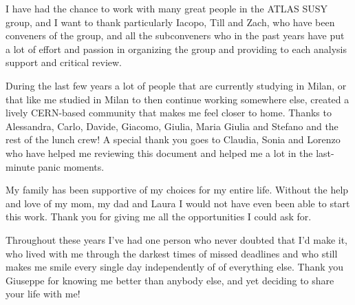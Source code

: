 \par\bigskip
I have had the chance to work with many great people in the ATLAS SUSY group, and 
I want to thank particularly Iacopo, Till and Zach, who have been conveners of the group,
and all the subconveners who in the past years 
have put a lot of effort and passion in organizing the group and providing to each 
analysis support and critical review. 

\par\bigskip 

During the last few years a lot of people that are currently studying in Milan, or that like me 
studied in Milan to then continue working somewhere else, created a lively CERN-based community that 
makes me feel closer to home. 
Thanks to Alessandra, Carlo, Davide, Giacomo, Giulia, Maria Giulia and Stefano and the rest of the 
lunch crew! A special thank you goes to Claudia, Sonia and Lorenzo who have helped me reviewing this document and 
helped me a lot in the last-minute panic moments. 

\par\bigskip 
My family has been supportive of my choices for my entire life. 
Without the help and love of my mom, my dad and Laura I would not have even been able to start this work. 
Thank you for giving me all the opportunities I could ask for. 

\par\bigskip 
Throughout these years I've had one person who never doubted that I'd make it, 
who lived with me through the darkest times of missed deadlines 
and who still makes me smile every single day independently 
of of everything else. 
Thank you Giuseppe for knowing me better than anybody else, 
and yet deciding to share your life with me! 


